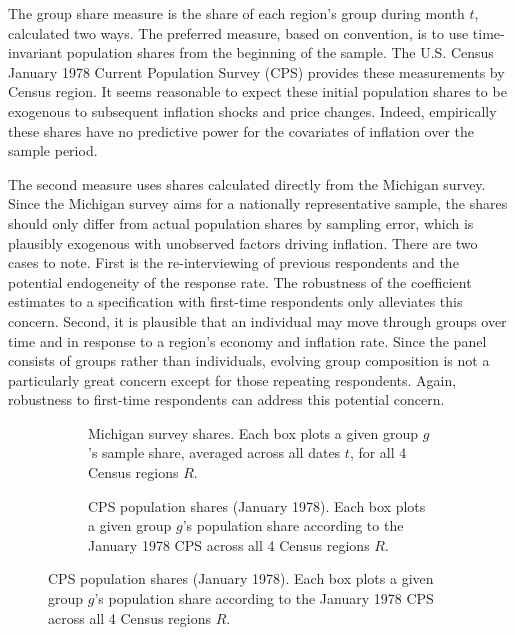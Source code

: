 \documentclass[12pt]{article}
\begin{document}
The group share measure is the share of each region's group during month $t$, calculated two ways. The preferred measure, based on convention, is to use time-invariant population shares from the beginning of the sample. The U.S. Census January 1978 Current Population Survey (CPS) provides these measurements by Census region. It seems reasonable to expect these initial population shares to be exogenous to subsequent inflation shocks and price changes. Indeed, empirically these shares have no predictive power for the covariates of inflation over the sample period.  

The second measure uses shares calculated directly from the Michigan survey. Since the Michigan survey aims for a nationally representative sample, the shares should only differ from actual population shares by sampling error, which is plausibly exogenous with unobserved factors driving inflation. There are two cases to note. First is the re-interviewing of previous respondents and the potential endogeneity of the response rate. The robustness of the coefficient estimates to a specification with first-time respondents only alleviates this concern. Second, it is plausible that an individual may move through groups over time and in response to a region's economy and inflation rate. Since the panel consists of groups rather than individuals, evolving group composition is not a particularly great concern except for those repeating respondents. Again, robustness to first-time respondents can address this potential concern.

\begin{figure}
\centering
\caption{Calculated group shares.}\label{fig:shares}
\begin{subfigure}[t]{\textwidth}
\centering

\caption{Michigan survey shares. Each box plots a given group $g$'s sample share, averaged across all dates $t$, for all 4 Census regions $R$.}\label{subfig:shares:group}
\end{subfigure}
\quad
\begin{subfigure}[t]{\textwidth}
\centering

\caption{CPS population shares (January 1978). Each box plots a given group $g$'s population share according to the January 1978 CPS across all 4 Census regions $R$.}\label{subfig:shares:cps}
\end{subfigure}
\end{figure}
\end{document}
